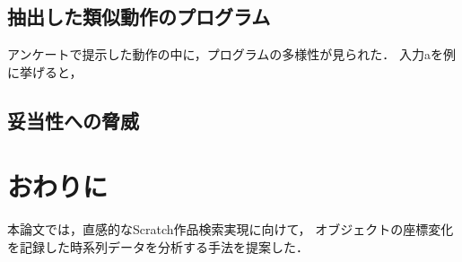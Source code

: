 \documentclass[11pt]{jreport}
\begin{document}
\section{抽出した類似動作のプログラム}
アンケートで提示した動作の中に，プログラムの多様性が見られた．
入力aを例に挙げると，

\section{妥当性への脅威}

\chapter{おわりに}
本論文では，直感的なScratch作品検索実現に向けて，
オブジェクトの座標変化を記録した時系列データを分析する手法を提案した．



 \begin{acknowledgements}
 \end{acknowledgements}

\end{document}
